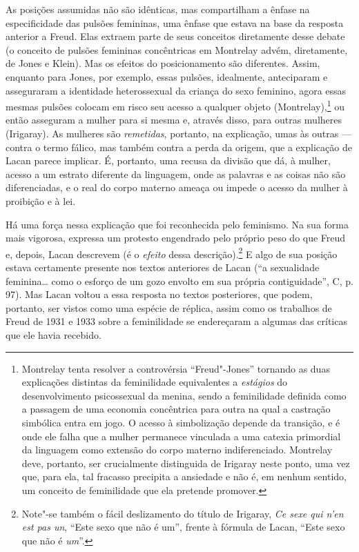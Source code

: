 As posições assumidas não são idênticas, mas compartilham a ênfase na
especificidade das pulsões femininas, uma ênfase que estava na base da
resposta anterior a Freud. Elas extraem parte de seus conceitos
diretamente desse debate (o conceito de pulsões femininas concêntricas
em Montrelay advém, diretamente, de Jones e Klein). Mas os efeitos do
posicionamento são diferentes. Assim, enquanto para Jones, por exemplo,
essas pulsões, idealmente, anteciparam e asseguraram a identidade
heterossexual da criança do sexo feminino, agora essas mesmas pulsões
colocam em risco seu acesso a qualquer objeto (Montrelay),\footnote{Montrelay
  tenta resolver a controvérsia ``Freud"-Jones'' tornando as duas
  explicações distintas da feminilidade equivalentes a \emph{estágios}
  do desenvolvimento psicossexual da menina, sendo a feminilidade
  definida como a passagem de uma economia concêntrica para outra na
  qual a castração simbólica entra em jogo. O acesso à simbolização
  depende da transição, e é onde ele falha que a mulher permanece
  vinculada a uma catexia primordial da linguagem como extensão do corpo
  materno indiferenciado. Montrelay deve, portanto, ser crucialmente
  distinguida de Irigaray neste ponto, uma vez que, para ela, tal
  fracasso precipita a ansiedade e não é, em nenhum sentido, um conceito
  de feminilidade que ela pretende promover.} ou então asseguram a
mulher para si mesma e, através disso, para outras mulheres (Irigaray).
As mulheres são \emph{remetidas}, portanto, na explicação, umas às
outras --- contra o termo fálico, mas também contra a perda da origem,
que a explicação de Lacan parece implicar. É, portanto, uma recusa da
divisão que dá, à mulher, acesso a um estrato diferente da linguagem,
onde as palavras e as coisas não são diferenciadas, e o real do corpo
materno ameaça ou impede o acesso da mulher à proibição e à lei.

Há uma força nessa explicação que foi reconhecida pelo feminismo. Na sua
forma mais vigorosa, expressa um protesto engendrado pelo próprio peso
do que Freud e, depois, Lacan descrevem (é o \emph{efeito} dessa
descrição).\footnote{Note"-se também o fácil deslizamento do título de
  Irigaray, \emph{Ce sexe qui n'en est pas un}, ``Este sexo que não é
  um'', frente à fórmula de Lacan, ``Este sexo que não é \emph{um}''.}
E algo de sua posição estava certamente presente nos textos anteriores
de Lacan (``a sexualidade feminina\ldots{} como o esforço de um gozo envolto
em sua própria contiguidade'', C, p. 97). Mas Lacan voltou a essa
resposta no textos posteriores, que podem, portanto, ser vistos como uma
espécie de réplica, assim como os trabalhos de Freud de 1931 e 1933
sobre a feminilidade se endereçaram a algumas das críticas que ele havia
recebido.

